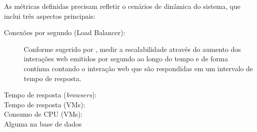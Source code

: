%
As métricas definidas precisam refletir o cenários de dinâmica do sistema, que inclui três aspectos principais:
\begin{description}
	\item[Conexões por segundo (Load Balancer):] Conforme sugerido por \cite{Binnig2009}, medir a escalabilidade através do aumento dos interações web emitidos por segundo ao longo do tempo e de forma contínua contando o interação web que são respondidas em um intervalo de tempo de resposta.
	\item[Tempo de resposta (\textit{browsers}):]
	\item[Tempo de resposta (VMs):]
	\item[Consumo de CPU (VMs):]
	\item[Alguma na base de dados]
\end{description}






